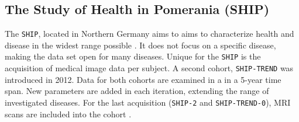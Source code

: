 \documentclass[journal]{style/vgtc} 			          %
\begin{document}
\subsection{The Study of Health in Pomerania (SHIP)}
The \texttt{SHIP}, located in Northern Germany aims to aims to characterize health and disease in the widest range possible \cite{Volzke2011}.
It does not focus on a specific disease, making the data set open for many diseases.
Unique for the \texttt{SHIP} is the acquisition of medical image data per subject.
A second cohort, \texttt{SHIP-TREND} was introduced in 2012.
Data for both cohorts are examined in a in a 5-year time span.
New parameters are added in each iteration, extending the range of investigated diseases.
For the last acquisition (\texttt{SHIP-2} and \texttt{SHIP-TREND-0}), MRI scans are included into the cohort \cite{Hegenscheid2009, Ivanovska2014}.
%
%
%
%
%
%
\end{document}
